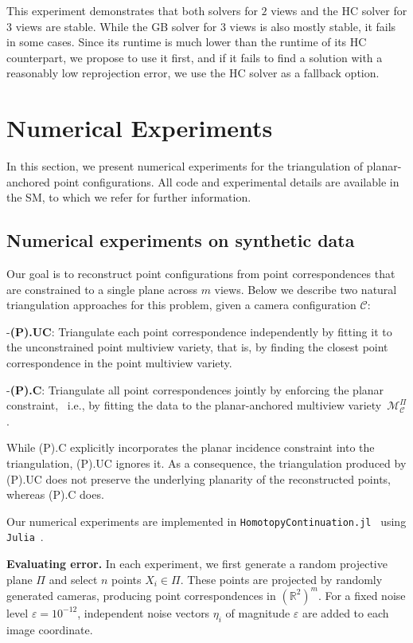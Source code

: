 \documentclass{article}
\begin{document}
 This experiment demonstrates that both solvers for $2$ views and the HC solver for $3$ views are stable. While the GB solver for $3$ views is also mostly stable, it fails in some cases. Since its runtime is much lower than the runtime of its HC counterpart, we propose to use it first, and if it fails to find a solution with a reasonably low reprojection error, we use the HC solver as a fallback option.
 
\section{Numerical Experiments}
In this section, we present numerical experiments for the triangulation of planar-anchored point configurations. All code and experimental details are available in the SM, to which we refer for further information.

\subsection{Numerical experiments on synthetic data} \label{sec:synthetic}
Our goal is to reconstruct point configurations from point correspondences that are constrained to a single plane across \( m \) views. Below we describe two natural triangulation approaches for this problem, given a camera configuration \( \mathcal{C} \):

-\textbf{(P).UC}: Triangulate each point correspondence independently by fitting it to the unconstrained point multiview variety, that is, by finding the closest point correspondence in the point multiview variety.

-\textbf{(P).C}: Triangulate all point correspondences jointly by enforcing the planar constraint, \ i.e., by fitting the data to the planar-anchored multiview variety~\( \mathcal{M}^\Pi_{\mathcal{C}} \).

While (P).C explicitly incorporates the planar incidence constraint into the triangulation, (P).UC ignores it. As a consequence, the triangulation produced by (P).UC does not preserve the underlying planarity of the reconstructed points, whereas (P).C does.

Our numerical experiments are implemented in \texttt{HomotopyContinuation.jl}~\cite{HC.jl} using \texttt{Julia}~\cite{bezanson2012julia}.

\textbf{Evaluating error.} In each experiment, we first generate a random projective plane $\Pi$ and select $n$ points $X_i \in \Pi$. These points are projected by randomly generated cameras, producing point correspondences in $(\mathbb{R}^2)^m$. For a fixed noise level $\varepsilon = 10^{-12}$, independent noise vectors $\eta_i$ of magnitude $\varepsilon$ are added to each image coordinate.
\end{document}
